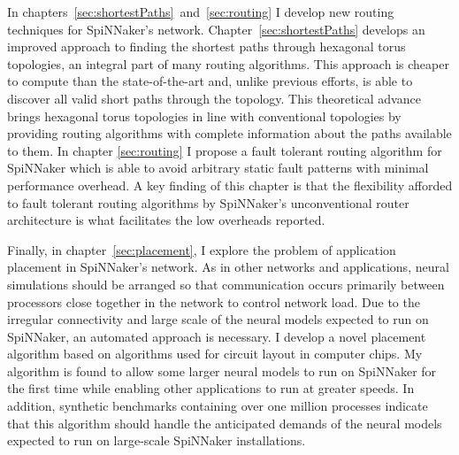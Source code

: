 In chapters~\ref{sec:shortestPaths}~and~\ref{sec:routing} I develop new routing
techniques for SpiNNaker's network. Chapter~\ref{sec:shortestPaths} develops an
improved approach to finding the shortest paths through hexagonal torus
topologies, an integral part of many routing algorithms. This approach is
cheaper to compute than the state-of-the-art and, unlike previous efforts, is
able to discover all valid short paths through the topology. This theoretical
advance brings hexagonal torus topologies in line with conventional topologies
by providing routing algorithms with complete information about the paths
available to them. In chapter \ref{sec:routing} I propose a fault tolerant
routing algorithm for SpiNNaker which is able to avoid arbitrary static fault
patterns with minimal performance overhead. A key finding of this chapter is
that the flexibility afforded to fault tolerant routing algorithms by
SpiNNaker's unconventional router architecture is what facilitates the low
overheads reported.

Finally, in chapter~\ref{sec:placement}, I explore the problem of application
placement in SpiNNaker's network. As in other networks and applications, neural
simulations should be arranged so that communication occurs primarily between
processors close together in the network to control network load. Due to the
irregular connectivity and large scale of the neural models expected to run on
SpiNNaker, an automated approach is necessary. I develop a novel placement
algorithm based on algorithms used for circuit layout in computer chips. My
algorithm is found to allow some larger neural models to run on SpiNNaker for
the first time while enabling other applications to run at greater speeds. In
addition, synthetic benchmarks containing over one million processes indicate
that this algorithm should handle the anticipated demands of the neural models
expected to run on large-scale SpiNNaker installations.
